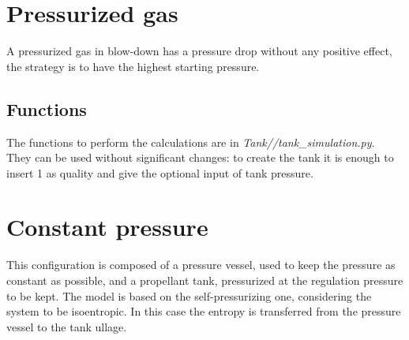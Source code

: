 \section{Pressurized gas}
A pressurized gas in blow-down has a pressure drop without any positive effect, the strategy is to have the highest starting pressure.
\subsection{Functions}
The functions to perform the calculations are in \textit{Tank//tank\_simulation.py}.\\
They can be used without significant changes: to create the tank it is enough to insert 1 as quality and give the optional input of tank pressure.
\section{Constant pressure}
This configuration is composed of a pressure vessel, used to keep the pressure as constant as possible, and a propellant tank, pressurized at the regulation pressure to be kept.
The model is based on the self-pressurizing one, considering the system to be isoentropic. In this case the entropy is transferred from the pressure vessel to the tank ullage.
